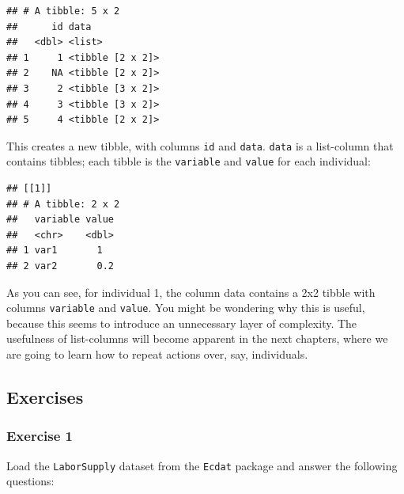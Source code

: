 \documentclass[]{gitbook}
\newenvironment{Shaded}{\begin{snugshade}}{\end{snugshade}}
\newcommand{\KeywordTok}[1]{\textcolor[rgb]{0.13,0.29,0.53}{\textbf{#1}}}
\newcommand{\NormalTok}[1]{#1}
\newcommand{\OperatorTok}[1]{\textcolor[rgb]{0.81,0.36,0.00}{\textbf{#1}}}
\newcommand{\StringTok}[1]{\textcolor[rgb]{0.31,0.60,0.02}{#1}}
\theoremstyle{definition}
\theoremstyle{definition}
\theoremstyle{definition}
\theoremstyle{remark}
\begin{document}
\begin{verbatim}
## # A tibble: 5 x 2
##      id data            
##   <dbl> <list>          
## 1     1 <tibble [2 x 2]>
## 2    NA <tibble [2 x 2]>
## 3     2 <tibble [3 x 2]>
## 4     3 <tibble [3 x 2]>
## 5     4 <tibble [2 x 2]>
\end{verbatim}

This creates a new tibble, with columns \texttt{id} and \texttt{data}.
\texttt{data} is a list-column that contains tibbles; each tibble is the
\texttt{variable} and \texttt{value} for each individual:

\begin{Shaded}
\end{Shaded}

\begin{verbatim}
## [[1]]
## # A tibble: 2 x 2
##   variable value
##   <chr>    <dbl>
## 1 var1       1  
## 2 var2       0.2
\end{verbatim}

As you can see, for individual 1, the column data contains a 2x2 tibble
with columns \texttt{variable} and \texttt{value}. You might be
wondering why this is useful, because this seems to introduce an
unnecessary layer of complexity. The usefulness of list-columns will
become apparent in the next chapters, where we are going to learn how to
repeat actions over, say, individuals.

\hypertarget{exercises-2}{%
\subsection{Exercises}\label{exercises-2}}

\hypertarget{exercise-1-2}{%
\subsubsection*{Exercise 1}\label{exercise-1-2}}

Load the \texttt{LaborSupply} dataset from the \texttt{Ecdat} package
and answer the following questions:
\end{document}
